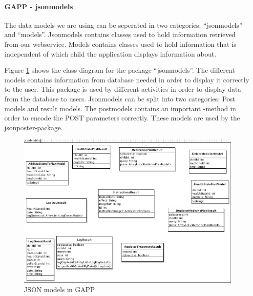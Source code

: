 \paragraph{GAPP - jsonmodels}
The data models we are using can be seperated in two categories; ``jsonmodels'' and ``models''. Jsonmodels contains classes
used to hold information retrieved from our webservice.
Models contains classes used to hold information that is independent of which child the application 
displays information about.

 
Figure \ref{fig:class-diagram-parent-jsonmodels} shows the class diagram for the package ``jsonmodels''. 
The different models contains information from database needed in order to display it correctly to the user. This package is used by different activities
in order to display data from the database to users. 
Jsonmodels can be split into two categories; Post models and result models. The postmodels contains an 
important -method in order to encode the POST parameters correctly. These models are used by the jsonposter-package. 
\begin{figure}
	\centering
		\includegraphics[width = \linewidth]{Pictures/ArchPictures/jsonmodels.png}
	\caption{JSON models in GAPP}
	\label{fig:class-diagram-parent-jsonmodels}
\end{figure}



